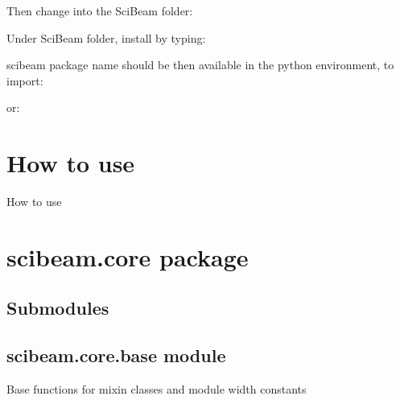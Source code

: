\documentclass[letterpaper,10pt,english]{sphinxmanual}
\begin{document}
Then change into the SciBeam folder:

%
\begin{sphinxVerbatim}[commandchars=\\\{\}]
 
\end{sphinxVerbatim}

Under SciBeam folder, install by typing:

%
\begin{sphinxVerbatim}[commandchars=\\\{\}]
  
\end{sphinxVerbatim}

scibeam package name should be then available in the python environment, to import:

%
\begin{sphinxVerbatim}[commandchars=\\\{\}]
 
\end{sphinxVerbatim}

or:

%
\begin{sphinxVerbatim}[commandchars=\\\{\}]
   
\end{sphinxVerbatim}


\chapter{How to use}
\label{\detokenize{how_to_use:how-to-use}}\label{\detokenize{how_to_use::doc}}
How to use


\chapter{scibeam.core package}
\label{\detokenize{scibeam.core:scibeam-core-package}}\label{\detokenize{scibeam.core::doc}}

\section{Submodules}
\label{\detokenize{scibeam.core:submodules}}

\section{scibeam.core.base module}
\label{\detokenize{scibeam.core:module-scibeam.core.base}}\label{\detokenize{scibeam.core:scibeam-core-base-module}}
Base functions for mixin classes and module width constants
\end{document}
